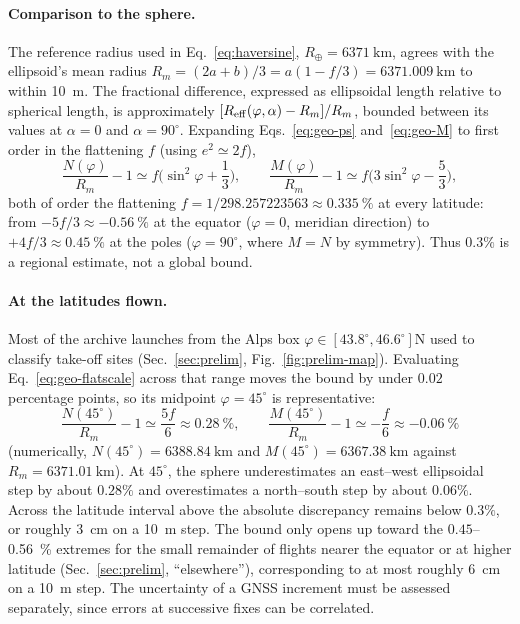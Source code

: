 \begin{revblock}
\paragraph{Comparison to the sphere.}
The reference radius used in Eq.~\eqref{eq:haversine}, $R_\oplus=\SI{6371}{\kilo\metre}$,
agrees with the ellipsoid's mean radius $R_m=(2a+b)/3=a(1-f/3)=\SI{6371.009}{\kilo\metre}$
to within \SI{10}{\metre}. The fractional difference, expressed as ellipsoidal
length relative to spherical length, is approximately
$[R_{\rm eff}(\varphi,\alpha)-R_m]/R_m$, bounded between its values at $\alpha=0$ and
$\alpha=90^\circ$. Expanding Eqs.~\eqref{eq:geo-ps} and~\eqref{eq:geo-M} to first order in
the flattening $f$ (using $e^2\simeq2f$),
\begin{equation}
\label{eq:geo-flatscale}
\frac{N(\varphi)}{R_m}-1\simeq f\Big(\sin^2\varphi+\frac13\Big),\qquad
\frac{M(\varphi)}{R_m}-1\simeq f\Big(3\sin^2\varphi-\frac53\Big),
\end{equation}
both of order the flattening $f=1/298.257223563\approx\SI{0.335}{\percent}$ at every
latitude: from $-5f/3\approx\SI{-0.56}{\percent}$ at the equator ($\varphi=0$, meridian
direction) to $+4f/3\approx\SI{0.45}{\percent}$ at the poles ($\varphi=90^\circ$, where
$M=N$ by symmetry). Thus $0.3\%$ is a regional estimate, not a global bound.

\paragraph{At the latitudes flown.}
Most of the archive launches from the Alps box $\varphi\in[43.8^\circ,46.6^\circ]$N used
to classify take-off sites (Sec.~\ref{sec:prelim}, Fig.~\ref{fig:prelim-map}). Evaluating
Eq.~\eqref{eq:geo-flatscale} across that range moves the bound by under $0.02$ percentage
points, so its midpoint $\varphi=45^\circ$ is representative:
\begin{equation}
\frac{N(45^\circ)}{R_m}-1\simeq\frac{5f}{6}\approx\SI{0.28}{\percent},\qquad
\frac{M(45^\circ)}{R_m}-1\simeq-\frac{f}{6}\approx\SI{-0.06}{\percent}
\end{equation}
(numerically, $N(45^\circ)=\SI{6388.84}{\kilo\metre}$ and $M(45^\circ)=\SI{6367.38}{\kilo\metre}$
against $R_m=\SI{6371.01}{\kilo\metre}$). At $45^\circ$, the sphere
underestimates an east--west ellipsoidal step by about $0.28\%$ and
overestimates a north--south step by about $0.06\%$. Across the latitude
interval above the absolute discrepancy remains below $0.3\%$, or roughly
\SI{3}{\centi\metre} on a \SI{10}{\metre} step. The
bound only opens up toward the $0.45$--\SI{0.56}{\percent} extremes for the small remainder
of flights nearer the equator or at higher latitude (Sec.~\ref{sec:prelim}, ``elsewhere''),
corresponding to at most roughly \SI{6}{\centi\metre} on a \SI{10}{\metre} step.
The uncertainty of a GNSS increment must be assessed separately, since errors at
successive fixes can be correlated.
\end{revblock}
